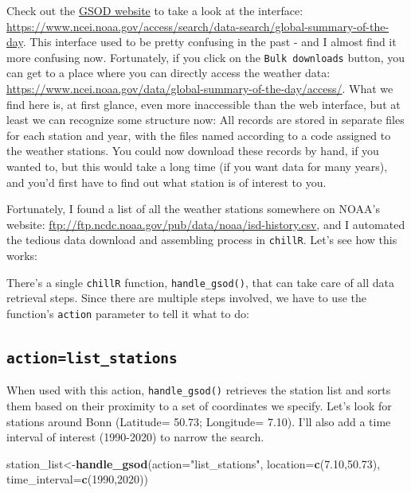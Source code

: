 \documentclass[
]{book}
\newenvironment{Shaded}{\begin{snugshade}}{\end{snugshade}}
\newcommand{\DataTypeTok}[1]{\textcolor[rgb]{0.13,0.29,0.53}{#1}}
\newcommand{\DecValTok}[1]{\textcolor[rgb]{0.00,0.00,0.81}{#1}}
\newcommand{\FloatTok}[1]{\textcolor[rgb]{0.00,0.00,0.81}{#1}}
\newcommand{\KeywordTok}[1]{\textcolor[rgb]{0.13,0.29,0.53}{\textbf{#1}}}
\newcommand{\NormalTok}[1]{#1}
\newcommand{\StringTok}[1]{\textcolor[rgb]{0.31,0.60,0.02}{#1}}
\begin{document}
Check out the \href{https://www.ncei.noaa.gov/access/search/data-search/global-summary-of-the-day}{GSOD website} to take a look at the interface: \url{https://www.ncei.noaa.gov/access/search/data-search/global-summary-of-the-day}. This interface used to be pretty confusing in the past - and I almost find it more confusing now. Fortunately, if you click on the \texttt{Bulk\ downloads} button, you can get to a place where you can directly access the weather data: \url{https://www.ncei.noaa.gov/data/global-summary-of-the-day/access/}. What we find here is, at first glance, even more inaccessible than the web interface, but at least we can recognize some structure now: All records are stored in separate files for each station and year, with the files named according to a code assigned to the weather stations. You could now download these records by hand, if you wanted to, but this would take a long time (if you want data for many years), and you'd first have to find out what station is of interest to you.

Fortunately, I found a list of all the weather stations somewhere on NOAA's website: \url{ftp://ftp.ncdc.noaa.gov/pub/data/noaa/isd-history.csv}, and I automated the tedious data download and assembling process in \texttt{chillR}. Let's see how this works:

There's a single \texttt{chillR} function, \texttt{handle\_gsod()}, that can take care of all data retrieval steps. Since there are multiple steps involved, we have to use the function's \texttt{action} parameter to tell it what to do:

\hypertarget{actionlist_stations}{%
\subsection{\texorpdfstring{\texttt{action=list\_stations}}{action=list\_stations}}\label{actionlist_stations}}

When used with this action, \texttt{handle\_gsod()} retrieves the station list and sorts them based on their proximity to a set of coordinates we specify. Let's look for stations around Bonn (Latitude= 50.73; Longitude= 7.10). I'll also add a time interval of interest (1990-2020) to narrow the search.

\begin{Shaded}
\begin{Highlighting}[]
\NormalTok{station_list<-}\KeywordTok{handle_gsod}\NormalTok{(}\DataTypeTok{action=}\StringTok{"list_stations"}\NormalTok{,}
                          \DataTypeTok{location=}\KeywordTok{c}\NormalTok{(}\FloatTok{7.10}\NormalTok{,}\FloatTok{50.73}\NormalTok{),}
                          \DataTypeTok{time_interval=}\KeywordTok{c}\NormalTok{(}\DecValTok{1990}\NormalTok{,}\DecValTok{2020}\NormalTok{))}
\end{Highlighting}
\end{Shaded}
\end{document}
